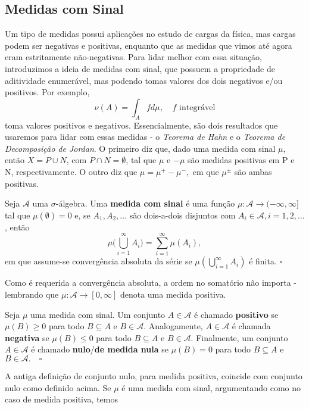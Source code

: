 \documentclass[measure_theory.tex]{subfiles}
\begin{document}
\subsection{Medidas com Sinal}
Um tipo de medidas possui aplicações no estudo de cargas da física, mas cargas podem ser negativas e positivas, enquanto que as medidas que vimos até agora eram estritamente não-negativas. Para lidar melhor com essa situação, introduzimos a ideia de medidas
com sinal, que possuem a propriedade de aditividade enumerável, mas podendo tomas valores dos dois negativos e/ou positivos. Por exemplo,
\[
	\nu(A) = \int_{A}f d\mu_{},\quad f \text{ integrável}
\]
toma valores positivos e negativos. Essencialmente, são dois resultados que usaremos para lidar com essas medidas - o \textit{Teorema de Hahn} e o \textit{Teorema de Decomposição de Jordan}. O primeiro diz que,
dado uma medida com sinal \(\mu \), então \(X = P\cup N\), com \(P\cap N = \emptyset \), tal que \(\mu \) e \(-\mu \) são medidas positivas em P e N, respectivamente. O outro diz que \(\mu  = \mu ^{+} - \mu ^{-},\) em que \(\mu ^{\pm}\) são ambas positivas.
\begin{def*}
	Seja \(\mathcal{A}\) uma \(\sigma \)-álgebra. Uma \textbf{medida com sinal} é uma função \(\mu : \mathcal{A}\rightarrow (-\infty, \infty]\) tal que \(\mu (\emptyset ) = 0\) e, se \(A_{1}, A_2, \dotsc \) são dois-a-dois disjuntos com \(A_{i}\in \mathcal{A}, i = 1, 2, \dotsc \), então
	\[
		\mu \biggl(\bigcup_{i=1}^{\infty}A_{i}\biggr) = \sum\limits_{i=1}^{\infty}\mu (A_{i}),
	\]
	em que assume-se convergência absoluta da série se \(\mu (\bigcup_{i=1}^{\infty}A_{i})\) é finita. \(\square\)
\end{def*}
Como é requerida a convergência absoluta, a ordem no somatório não importa - lembrando que \(\mu :\mathcal{A}\rightarrow [0, \infty]\) denota uma medida positiva.
\begin{def*}
	Seja \(\mu \) uma medida com sinal. Um conjunto \(A\in \mathcal{A}\) é chamado \textbf{positivo} se \(\mu (B) \geq 0\) para todo \(B\subseteq A\) e \(B\in \mathcal{A}.\) Analogamente, \(A\in \mathcal{A}\) é chamada \textbf{negativa} se \(\mu (B)\leq 0\) para
	todo \(B\subseteq A\) e \(B\in \mathcal{A}.\) Finalmente, um conjunto \(A\in \mathcal{A}\) é chamado \textbf{nulo}/\textbf{de medida nula} se \(\mu (B) = 0 \) para todo \(B\subseteq A\) e \(B\in \mathcal{A}.\quad \square\)
\end{def*}
A antiga definição de conjunto nulo, para medida positiva, coincide com conjunto nulo como definido acima. Se \(\mu \) é uma medida com sinal, argumentando como no caso de medida positiva, temos
\end{document}
